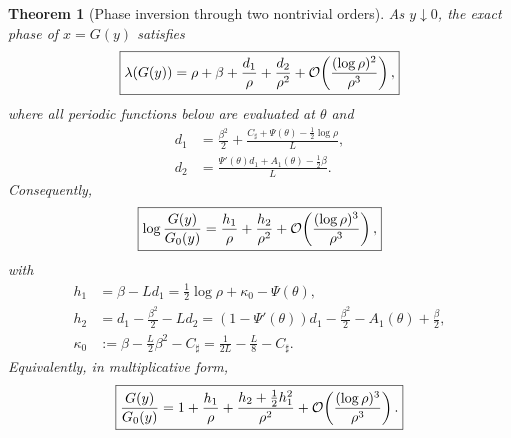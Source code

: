 \documentclass[11pt,oneside]{article}
\numberwithin{equation}{section}
\newtheorem{theorem}{Theorem}[section]
\theoremstyle{definition}
\theoremstyle{remark}
\begin{document}
\begin{theorem}[Phase inversion through two nontrivial orders]
\label{p1:thm:phase-two-orders}
As $y\downarrow0$, the exact phase of $x=G(y)$ satisfies
\begin{equation}
 \boxed{
 \lambda(G(y))=
 \rho+\beta+\frac{d_1}{\rho}+\frac{d_2}{\rho^2}
 +\mathcal O\!\left(\frac{(\log\rho)^2}{\rho^3}\right),}
 \label{p1:eq:lambda-inverse-two-orders}
\end{equation}
where all periodic functions below are evaluated at $\theta$ and
\begin{align}
 d_1&=\frac{\beta^2}{2}
 +\frac{C_{\sharp}+\Psi(\theta)-\tfrac12\log\rho}{L},
 \label{p1:eq:d1-endpoint}\\
 d_2&=\frac{\Psi'(\theta)d_1+A_1(\theta)-\tfrac12\beta}{L}.
 \label{p1:eq:d2-endpoint}
\end{align}
Consequently,
\begin{equation}
 \boxed{
 \log\frac{G(y)}{G_0(y)}
 =\frac{h_1}{\rho}+\frac{h_2}{\rho^2}
 +\mathcal O\!\left(\frac{(\log\rho)^3}{\rho^3}\right),}
 \label{p1:eq:log-inverse-two-orders}
\end{equation}
with
\begin{align}
 h_1&=\beta-Ld_1
 =\frac12\log\rho+\kappa_0-\Psi(\theta),
 \label{p1:eq:h1}\\
 h_2&=d_1-\frac{\beta^2}{2}-Ld_2
 =(1-\Psi'(\theta))d_1-\frac{\beta^2}{2}
   -A_1(\theta)+\frac\beta2,
 \label{p1:eq:h2}\\
 \kappa_0&:=\beta-\frac L2\beta^2-C_{\sharp}
 =\frac1{2L}-\frac L8-C_{\sharp}.
 \label{p1:eq:kappa0}
\end{align}
Equivalently, in multiplicative form,
\begin{equation}
 \boxed{
 \frac{G(y)}{G_0(y)}
 =1+\frac{h_1}{\rho}
 +\frac{h_2+\tfrac12h_1^2}{\rho^2}
 +\mathcal O\!\left(\frac{(\log\rho)^3}{\rho^3}\right).}
 \label{p1:eq:inverse-multiplicative-two-orders}
\end{equation}
\end{theorem}
\end{document}
